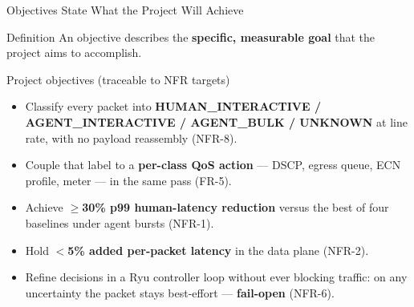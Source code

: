 \documentclass[aspectratio=169,11pt]{beamer}
\begin{document}
\begin{frame}{Objectives State What the Project Will Achieve}
  \begin{block}{Definition}
    An objective describes the \textbf{specific, measurable goal} that the project aims to
    accomplish.
  \end{block}
  \begin{alertblock}{Project objectives (traceable to NFR targets)}
    \begin{itemize}
      \item Classify every packet into \textbf{HUMAN\_INTERACTIVE / AGENT\_INTERACTIVE /
            AGENT\_BULK / UNKNOWN} at line rate, with no payload reassembly (NFR-8).
      \item Couple that label to a \textbf{per-class QoS action} --- DSCP, egress queue, ECN
            profile, meter --- in the same pass (FR-5).
      \item Achieve \textbf{$\geq$30\% p99 human-latency reduction} versus the best of four
            baselines under agent bursts (NFR-1).
      \item Hold \textbf{$<$5\% added per-packet latency} in the data plane (NFR-2).
      \item Refine decisions in a Ryu controller loop without ever blocking traffic: on any
            uncertainty the packet stays best-effort --- \textbf{fail-open} (NFR-6).
    \end{itemize}
  \end{alertblock}
\end{frame}
\end{document}
